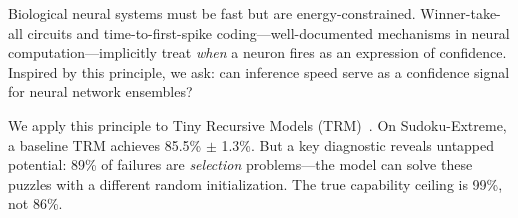 %
%
%

Biological neural systems must be fast but are energy-constrained. Winner-take-all circuits and time-to-first-spike coding---well-documented mechanisms in neural computation---implicitly treat \emph{when} a neuron fires as an expression of confidence. Inspired by this principle, we ask: can inference speed serve as a confidence signal for neural network ensembles?

We apply this principle to Tiny Recursive Models (TRM)~\citep{jolicoeur2025trm}. On Sudoku-Extreme, a baseline TRM achieves 85.5\% $\pm$ 1.3\%. But a key diagnostic reveals untapped potential: 89\% of failures are \emph{selection} problems---the model can solve these puzzles with a different random initialization. The true capability ceiling is 99\%, not 86\%.

